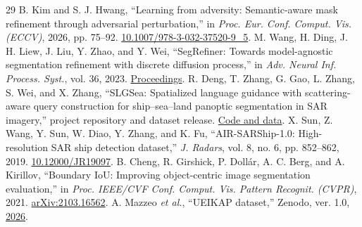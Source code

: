 \begin{thebibliography}{29}
 B. Kim and S. J. Hwang, ``Learning from adversity: Semantic-aware mask refinement through adversarial perturbation,'' in \emph{Proc. Eur. Conf. Comput. Vis. (ECCV)}, 2026, pp. 75--92. \href{https://doi.org/10.1007/978-3-032-37520-9_5}{10.1007/978-3-032-37520-9\_5}.
 M. Wang, H. Ding, J. H. Liew, J. Liu, Y. Zhao, and Y. Wei, ``SegRefiner: Towards model-agnostic segmentation refinement with discrete diffusion process,'' in \emph{Adv. Neural Inf. Process. Syst.}, vol. 36, 2023. \href{https://proceedings.neurips.cc/paper_files/paper/2023/hash/fc0cc55dca3d791c4a0bb2d8ddeefe4f-Abstract-Conference.html}{Proceedings}.
 R. Deng, T. Zhang, G. Gao, L. Zhang, S. Wei, and X. Zhang, ``SLGSea: Spatialized language guidance with scattering-aware query construction for ship--sea--land panoptic segmentation in SAR imagery,'' project repository and dataset release. \href{https://github.com/deng1218/SLGSea}{Code and data}.
 X. Sun, Z. Wang, Y. Sun, W. Diao, Y. Zhang, and K. Fu, ``AIR-SARShip-1.0: High-resolution SAR ship detection dataset,'' \emph{J. Radars}, vol. 8, no. 6, pp. 852--862, 2019. \href{https://doi.org/10.12000/JR19097}{10.12000/JR19097}.
 B. Cheng, R. Girshick, P. Doll{\'a}r, A. C. Berg, and A. Kirillov, ``Boundary IoU: Improving object-centric image segmentation evaluation,'' in \emph{Proc. IEEE/CVF Conf. Comput. Vis. Pattern Recognit. (CVPR)}, 2021. \href{https://arxiv.org/abs/2103.16562}{arXiv:2103.16562}.
 A. Mazzeo \emph{et al.}, ``UEIKAP dataset,'' Zenodo, ver. 1.0, \href{https://doi.org/10.5281/zenodo.18391027}{2026}.
\end{thebibliography}
